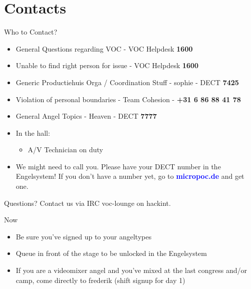 \documentclass[aspectratio=169]{beamer}
\begin{document}
\section{Contacts}			%
\begin{frame}{Who to Contact?}
\begin{itemize}
	\item General Questions regarding VOC - VOC Helpdesk \textbf{1600}
	\item Unable to find right person for issue - VOC Helpdesk \textbf{1600}
	\item Generic Productiehuis Orga / Coordination Stuff - sophie - DECT \textbf{7425}
	\item Violation of personal boundaries - Team Cohesion - \textbf{+31 6 86 88 41 78}
	\item General Angel Topics - Heaven - DECT \textbf{7777}
	\item In the hall:
	\begin{itemize}
		\item A/V Technician on duty
	\end{itemize} 
	\item We might need to call you. Please have your DECT number in the Engelsystem! If you don't have a number yet, go to 
	\textcolor{blue}{\textbf{micropoc.de}} and get one.
\end{itemize} 
\end{frame}

\begin{frame}{Questions?}
Contact us via IRC voc-lounge on hackint.
\end{frame}

\begin{frame}{Now}
	\begin{itemize}
		\item Be sure you've signed up to your angeltypes
		\item Queue in front of the stage to be unlocked in the Engelsystem
		\item If you are a videomixer angel and you've mixed at the last congress and/or camp, come directly to frederik (shift signup for day 1)
	\end{itemize} 
\end{frame}
\end{document}
